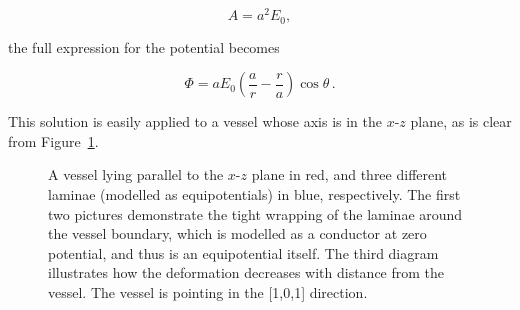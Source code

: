   \begin{equation}
    A = a^2E_0,
  \end{equation}
  
  the full expression for the potential becomes
  
  \begin{equation}
    \Phi = aE_0\left(\frac{a}{r} - \frac{r}{a} \right)\cos\theta\, .
    \label{eqn:potential}
  \end{equation}
  
  This solution is easily applied to a vessel whose axis is in the $x$-$z$ plane, as is clear from Figure~\ref{fig:coplanar}.
  
  \begin{figure}[htbp]
    \centering
    \caption{A vessel lying parallel to the $x$-$z$ plane in red, and three different laminae (modelled as equipotentials) in blue, respectively. The first two pictures demonstrate the tight wrapping of the laminae around the vessel boundary, which is modelled as a conductor at zero potential, and thus is an equipotential itself. The third diagram illustrates how the deformation decreases with distance from the vessel. The vessel is pointing in the [1,0,1] direction.}
    \label{fig:coplanar}
  \end{figure}
  
